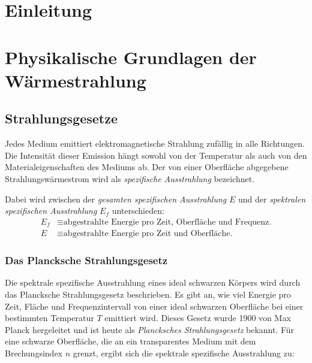 \documentclass[12pt,a4paper]{article}
\begin{document}



\setcounter{page}{2}
\tableofcontents
\newpage




\section{Einleitung}

\section{Physikalische Grundlagen der Wärmestrahlung}

\subsection{Strahlungsgesetze}
Jedes Medium emittiert elektromagnetische Strahlung zufällig in alle Richtungen. 
Die Intensität dieser Emission hängt sowohl von der Temperatur als auch von den Materialeigenschaften des Mediums ab. 
Der von einer Oberfläche abgegebene Strahlungswärmestrom wird als \textit{spezifische Ausstrahlung} bezeichnet.

Dabei wird zwischen der \textit{gesamten spezifischen Ausstrahlung} $E$ und der \textit{spektralen spezifischen Ausstrahlung} $E_f$ unterschieden:
\begin{align*}
E_f &\equiv \text{abgestrahlte Energie pro Zeit, Oberfläche und Frequenz.} \\
E &\equiv \text{abgestrahlte Energie pro Zeit und Oberfläche.}
\end{align*}
\cite[S.~6--7]{radiativeHeatTransfer}


\subsubsection{Das Plancksche Strahlungsgesetz}

Die spektrale spezifische Ausstrahlung eines ideal schwarzen Körpers wird durch das Plancksche Strahlungsgesetz beschrieben. 
Es gibt an, wie viel Energie pro Zeit, Fläche und Frequenzintervall von einer ideal schwarzen Oberfläche bei einer bestimmten Temperatur $T$ emittiert wird. 
Dieses Gesetz wurde 1900 von Max Planck \cite{plancknormalspektrum}\cite{plancknormalspektrumtheorie} hergeleitet und ist heute als \textit{Plancksches Strahlungsgesetz} bekannt. 
Für eine schwarze Oberfläche, die an ein transparentes Medium mit dem Brechungsindex $n$ grenzt, ergibt sich die spektrale spezifische Ausstrahlung\cite[S.7]{radiativeHeatTransfer} zu:
\end{document}
